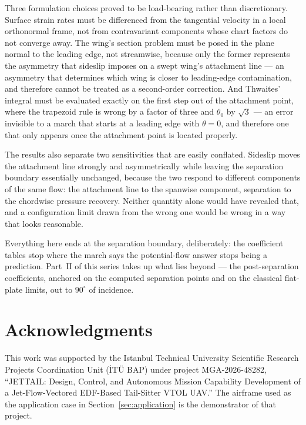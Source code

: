 \documentclass[submit]{aiaa-tc}%
\begin{document}
Three formulation choices proved to be load-bearing rather than
discretionary. Surface strain rates must be differenced from the
tangential velocity in a local orthonormal frame, not from contravariant
components whose chart factors do not converge away. The wing's section
problem must be posed in the plane normal to the leading edge, not
streamwise, because only the former represents the asymmetry that sideslip
imposes on a swept wing's attachment line --- an asymmetry that determines
which wing is closer to leading-edge contamination, and therefore cannot
be treated as a second-order correction. And Thwaites' integral must be
evaluated exactly on the first step out of the attachment point, where the
trapezoid rule is wrong by a factor of three and $\theta_0$ by $\sqrt{3}$
--- an error invisible to a march that starts at a leading edge with
$\theta = 0$, and therefore one that only appears once the attachment
point is located properly.

The results also separate two sensitivities that are easily conflated.
Sideslip moves the attachment line strongly and asymmetrically while
leaving the separation boundary essentially unchanged, because the two
respond to different components of the same flow: the attachment line to
the spanwise component, separation to the chordwise pressure recovery.
Neither quantity alone would have revealed that, and a configuration limit
drawn from the wrong one would be wrong in a way that looks reasonable.

Everything here ends at the separation boundary, deliberately: the
coefficient tables stop where the march says the potential-flow answer
stops being a prediction. Part~II of this series takes up what lies
beyond --- the post-separation coefficients, anchored on the computed
separation points and on the classical flat-plate limits, out to
$90^\circ$ of incidence.

\section*{Acknowledgments}

This work was supported by the Istanbul Technical University Scientific
Research Projects Coordination Unit (\.IT\"U BAP) under project
MGA-2026-48282, ``JETTAIL: Design, Control, and Autonomous Mission
Capability Development of a Jet-Flow-Vectored EDF-Based Tail-Sitter VTOL
UAV.'' The airframe used as the application case in
Section~\ref{sec:application} is the demonstrator of that project.




\end{document}
